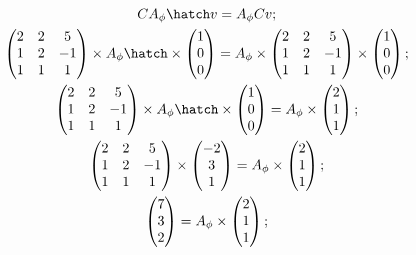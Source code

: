 \begin{gather*}
    CA_{\phi}\hatch v = A_{\phi}Cv;\\
    \begin{pmatrix}
        2 & 2 & 5\\
        1 & 2 & -1\\
        1 & 1 & 1
    \end{pmatrix} \times A_{\phi}\hatch \times \begin{pmatrix} 1\\ 0\\ 0 \end{pmatrix} = A_{\phi} \times \begin{pmatrix}
        2 & 2 & 5\\
        1 & 2 & -1\\
        1 & 1 & 1
    \end{pmatrix} \times \begin{pmatrix} 1\\ 0\\ 0 \end{pmatrix};\\
    \begin{pmatrix}
        2 & 2 & 5\\
        1 & 2 & -1\\
        1 & 1 & 1
    \end{pmatrix} \times A_{\phi}\hatch \times \begin{pmatrix} 1\\ 0\\ 0 \end{pmatrix} = A_{\phi} \times \begin{pmatrix}
        2\\ 1\\ 1
    \end{pmatrix};\\
    \begin{pmatrix}
        2 & 2 & 5\\
        1 & 2 & -1\\
        1 & 1 & 1
    \end{pmatrix} \times \begin{pmatrix} -2\\ 3\\ 1 \end{pmatrix} = A_{\phi} \times \begin{pmatrix}
        2\\ 1\\ 1
    \end{pmatrix};\\
    \begin{pmatrix} 7\\ 3\\ 2 \end{pmatrix} = A_{\phi} \times \begin{pmatrix} 2\\ 1\\ 1\end{pmatrix};
\end{gather*}

